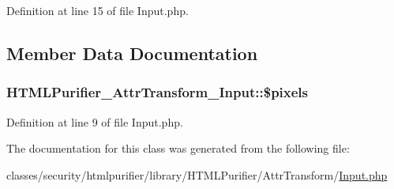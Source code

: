 Definition at line 15 of file Input.\+php.



\subsection{Member Data Documentation}
\hypertarget{classHTMLPurifier__AttrTransform__Input_a78d319c585f2108dcda04bd664788f8e}{
\subsubsection[{\$pixels}]{\setlength{\rightskip}{0pt plus 5cm}H\+T\+M\+L\+Purifier\+\_\+\+Attr\+Transform\+\_\+\+Input\+::\$pixels\hspace{0.3cm}{\ttfamily [protected]}}}\label{classHTMLPurifier__AttrTransform__Input_a78d319c585f2108dcda04bd664788f8e}


Definition at line 9 of file Input.\+php.



The documentation for this class was generated from the following file\+:\begin{DoxyCompactItemize}
\item 
classes/security/htmlpurifier/library/\+H\+T\+M\+L\+Purifier/\+Attr\+Transform/\hyperlink{Input_8php}{Input.\+php}\end{DoxyCompactItemize}
